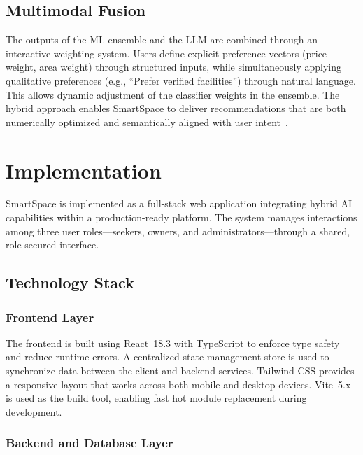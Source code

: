 \documentclass[pdflatex,sn-mathphys-num]{sn-jnl}
\theoremstyle{thmstyleone}
\theoremstyle{thmstyletwo}
\theoremstyle{thmstylethree}
\begin{document}
\subsection{Multimodal Fusion}\label{subsec:fusion}

The outputs of the ML ensemble and the LLM are combined through an interactive weighting system. Users define explicit preference vectors (price weight, area weight) through structured inputs, while simultaneously applying qualitative preferences (e.g., ``Prefer verified facilities'') through natural language. This allows dynamic adjustment of the classifier weights in the ensemble. The hybrid approach enables SmartSpace to deliver recommendations that are both numerically optimized and semantically aligned with user intent~\cite{b4}.


\section{Implementation}\label{sec4}

SmartSpace is implemented as a full-stack web application integrating hybrid AI capabilities within a production-ready platform. The system manages interactions among three user roles---seekers, owners, and administrators---through a shared, role-secured interface.

\subsection{Technology Stack}\label{subsec:tech}

\subsubsection{Frontend Layer}\label{subsubsec:frontend}

The frontend is built using React~18.3 with TypeScript to enforce type safety and reduce runtime errors. A centralized state management store is used to synchronize data between the client and backend services. Tailwind CSS provides a responsive layout that works across both mobile and desktop devices. Vite~5.x is used as the build tool, enabling fast hot module replacement during development.

\subsubsection{Backend and Database Layer}\label{subsubsec:backend}
\end{document}
